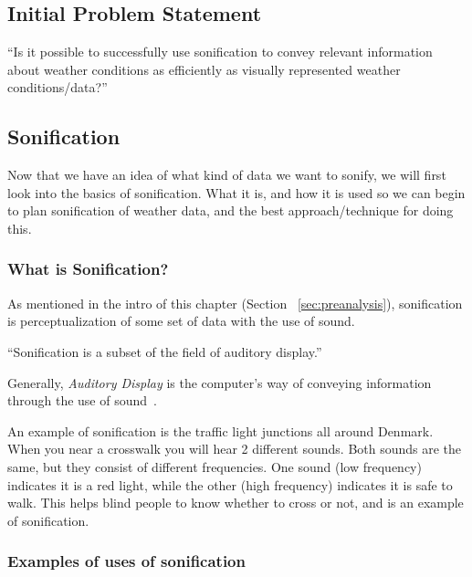 \pagebreak
\subsection{Initial Problem Statement} %
\label{sub:initial_problem_statement}

\enquote{Is it possible to successfully use sonification to convey relevant information about weather conditions as efficiently as visually represented weather conditions/data?}



\subsection{Sonification} %
\label{sub:sonification}

Now that we have an idea of what kind of data we want to sonify, we will first look into the basics of sonification. What it is, and how it is used so we can begin to plan sonification of weather data, and the best approach/technique for doing this.


\subsubsection{What is Sonification?} %
\label{ssub:what_is_sonification_}


As mentioned in the intro of this chapter (Section ~\ref{sec:preanalysis}), sonification is perceptualization of some set of data with the use of sound. 

\enquote{Sonification is a subset of the field of auditory display.}~\cite*{Walker2006}

Generally, \emph{Auditory Display} is the computer’s way of conveying information through the use of sound~\cite*{Wiki2014-3}.

An example of sonification is the traffic light junctions all around Denmark. 
When you near a crosswalk you will hear 2 different sounds. 
Both sounds are the same, but they consist of different frequencies. 
One sound (low frequency) indicates it is a red light, while the other (high frequency) indicates it is safe to walk. 
This helps blind people to know whether to cross or not, and is an example of sonification.





\subsubsection{Examples of uses of sonification} %
\label{ssub:examples_of_sonification}

